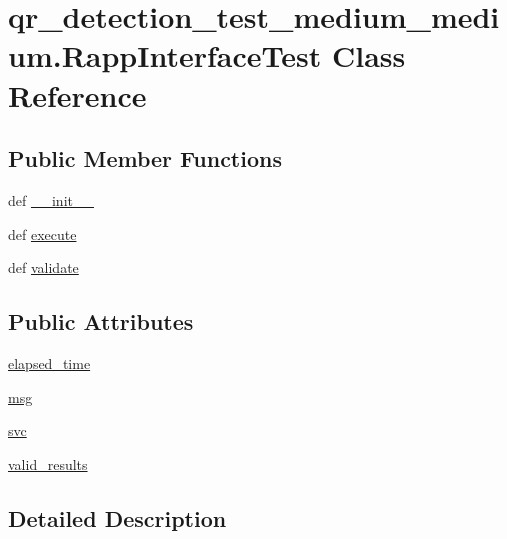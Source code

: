 \hypertarget{classqr__detection__test__medium__medium_1_1RappInterfaceTest}{\section{qr\-\_\-detection\-\_\-test\-\_\-medium\-\_\-medium.\-Rapp\-Interface\-Test Class Reference}
\label{classqr__detection__test__medium__medium_1_1RappInterfaceTest}
}
\subsection*{Public Member Functions}
\begin{DoxyCompactItemize}
\item 
def \hyperlink{classqr__detection__test__medium__medium_1_1RappInterfaceTest_a24a946445a38c1c88d681ba6710082d7}{\-\_\-\-\_\-init\-\_\-\-\_\-}
\item 
def \hyperlink{classqr__detection__test__medium__medium_1_1RappInterfaceTest_a6cb7c6b5c32824634db85be5509b03fc}{execute}
\item 
def \hyperlink{classqr__detection__test__medium__medium_1_1RappInterfaceTest_ac462ad2663c38aa2492b17a3ec2332b5}{validate}
\end{DoxyCompactItemize}
\subsection*{Public Attributes}
\begin{DoxyCompactItemize}
\item 
\hyperlink{classqr__detection__test__medium__medium_1_1RappInterfaceTest_a81bf413769089e9ecf769276571bb497}{elapsed\-\_\-time}
\item 
\hyperlink{classqr__detection__test__medium__medium_1_1RappInterfaceTest_a38316eaef4a7afdd3cac85873a6b2a6a}{msg}
\item 
\hyperlink{classqr__detection__test__medium__medium_1_1RappInterfaceTest_abcc071a89958914490cfc1bf8db9f0e1}{svc}
\item 
\hyperlink{classqr__detection__test__medium__medium_1_1RappInterfaceTest_a6a60ed7cde7aa3fc6ed3d451f80b187c}{valid\-\_\-results}
\end{DoxyCompactItemize}


\subsection{Detailed Description}


